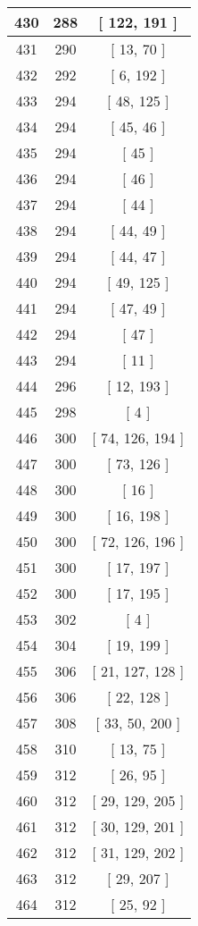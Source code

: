 \begin{center}
\begin{longtable}[H]{|| c c c ||}
\hline
430 & 288 & [ 122, 191 ] \\ 
\hline
431 & 290 & [ 13, 70 ] \\ 
\hline
432 & 292 & [ 6, 192 ] \\ 
\hline
433 & 294 & [ 48, 125 ] \\ 
\hline
434 & 294 & [ 45, 46 ] \\ 
\hline
435 & 294 & [ 45 ] \\ 
\hline
436 & 294 & [ 46 ] \\ 
\hline
437 & 294 & [ 44 ] \\ 
\hline
438 & 294 & [ 44, 49 ] \\ 
\hline
439 & 294 & [ 44, 47 ] \\ 
\hline
440 & 294 & [ 49, 125 ] \\ 
\hline
441 & 294 & [ 47, 49 ] \\ 
\hline
442 & 294 & [ 47 ] \\ 
\hline
443 & 294 & [ 11 ] \\ 
\hline
444 & 296 & [ 12, 193 ] \\ 
\hline
445 & 298 & [ 4 ] \\ 
\hline
446 & 300 & [ 74, 126, 194 ] \\ 
\hline
447 & 300 & [ 73, 126 ] \\ 
\hline
448 & 300 & [ 16 ] \\ 
\hline
449 & 300 & [ 16, 198 ] \\ 
\hline
450 & 300 & [ 72, 126, 196 ] \\ 
\hline
451 & 300 & [ 17, 197 ] \\ 
\hline
452 & 300 & [ 17, 195 ] \\ 
\hline
453 & 302 & [ 4 ] \\ 
\hline
454 & 304 & [ 19, 199 ] \\ 
\hline
455 & 306 & [ 21, 127, 128 ] \\ 
\hline
456 & 306 & [ 22, 128 ] \\ 
\hline
457 & 308 & [ 33, 50, 200 ] \\ 
\hline
458 & 310 & [ 13, 75 ] \\ 
\hline
459 & 312 & [ 26, 95 ] \\ 
\hline
460 & 312 & [ 29, 129, 205 ] \\ 
\hline
461 & 312 & [ 30, 129, 201 ] \\ 
\hline
462 & 312 & [ 31, 129, 202 ] \\ 
\hline
463 & 312 & [ 29, 207 ] \\ 
\hline
464 & 312 & [ 25, 92 ] \\ 

\end{longtable}
\end{center}
